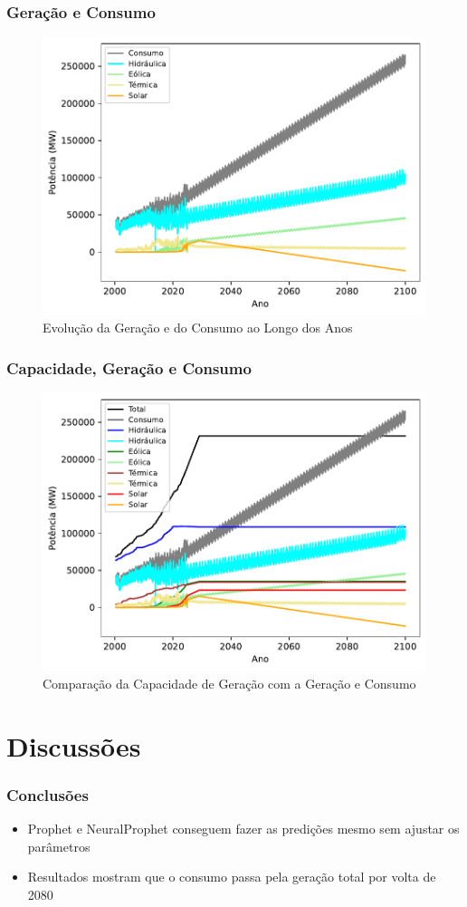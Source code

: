 \documentclass{beamer}
\begin{document}
\begin{frame}
\frametitle{Geração e Consumo}
\begin{figure}
    \centering
    \includegraphics[width=0.6\linewidth]{geracao-consumo.pdf}
    \caption{Evolução da Geração e do Consumo ao Longo dos Anos}
\end{figure}
\end{frame}



\begin{frame}
\frametitle{Capacidade, Geração e Consumo}
\begin{figure}
    \centering
    \includegraphics[width=0.6\linewidth]{capacidade-geracao-consumo.pdf}
    \caption{Comparação da Capacidade de Geração com a Geração e Consumo}
\end{figure}
\end{frame}


\section{Discussões}


\begin{frame}
\frametitle{Conclusões}
\begin{itemize}
    \item Prophet e NeuralProphet conseguem fazer as predições mesmo sem ajustar os parâmetros
    \item Resultados mostram que o consumo passa pela geração total por volta de 2080
\end{itemize}
\end{frame}
\end{document}
